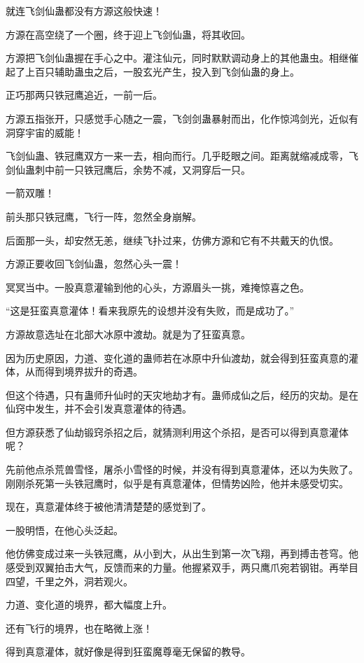 \begin{this_body}
就连飞剑仙蛊都没有方源这般快速！

方源在高空绕了一个圈，终于迎上飞剑仙蛊，将其收回。

方源把飞剑仙蛊握在手心之中。灌注仙元，同时默默调动身上的其他蛊虫。相继催起了上百只辅助蛊虫之后，一股玄光产生，投入到飞剑仙蛊的身上。

正巧那两只铁冠鹰追近，一前一后。

方源五指张开，只感觉手心随之一震，飞剑剑蛊暴射而出，化作惊鸿剑光，近似有洞穿宇宙的威能！

飞剑仙蛊、铁冠鹰双方一来一去，相向而行。几乎眨眼之间。距离就缩减成零，飞剑仙蛊刺中前一只铁冠鹰后，余势不减，又洞穿后一只。

一箭双雕！

前头那只铁冠鹰，飞行一阵，忽然全身崩解。

后面那一头，却安然无恙，继续飞扑过来，仿佛方源和它有不共戴天的仇恨。

方源正要收回飞剑仙蛊，忽然心头一震！

冥冥当中。一股真意灌输到他的心头，方源眉头一挑，难掩惊喜之色。

“这是狂蛮真意灌体！看来我原先的设想并没有失败，而是成功了。”

方源故意选址在北部大冰原中渡劫。就是为了狂蛮真意。

因为历史原因，力道、变化道的蛊师若在冰原中升仙渡劫，就会得到狂蛮真意的灌体，从而得到境界拔升的奇遇。

但这个待遇，只有蛊师升仙时的天灾地劫才有。蛊师成仙之后，经历的灾劫。是在仙窍中发生，并不会引发真意灌体的待遇。

但方源获悉了仙劫锻窍杀招之后，就猜测利用这个杀招，是否可以得到真意灌体呢？

先前他点杀荒兽雪怪，屠杀小雪怪的时候，并没有得到真意灌体，还以为失败了。刚刚杀死第一头铁冠鹰时，似乎是有真意灌体，但情势凶险，他并未感受切实。

现在，真意灌体终于被他清清楚楚的感觉到了。

一股明悟，在他心头泛起。

他仿佛变成过来一头铁冠鹰，从小到大，从出生到第一次飞翔，再到搏击苍穹。他感受到双翼拍击大气，反馈而来的力量。他握紧双手，两只鹰爪宛若钢钳。再举目四望，千里之外，洞若观火。

力道、变化道的境界，都大幅度上升。

还有飞行的境界，也在略微上涨！

得到真意灌体，就好像是得到狂蛮魔尊毫无保留的教导。


\end{this_body}
